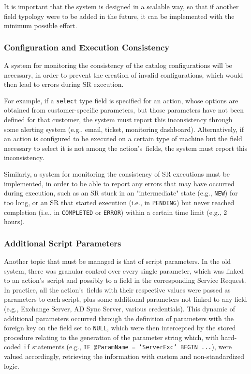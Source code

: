 It is important that the system is designed in a scalable way, so that if another field typology were to be added in the future, it can be implemented with the minimum possible effort.

\subsubsection{Configuration and Execution Consistency}
A system for monitoring the consistency of the catalog configurations \cite{requirements_meeting} will be necessary, in order to prevent the creation of invalid configurations, which would then lead to errors during SR execution.

For example, if a \texttt{select} type field is specified for an action, whose options are obtained from customer-specific parameters, but those parameters have not been defined for that customer, the system must report this inconsistency through some alerting system (e.g., email, ticket, monitoring dashboard).
Alternatively, if an action is configured to be executed on a certain type of machine but the field necessary to select it is not among the action's~fields, the system must report this inconsistency.

Similarly, a system for monitoring the consistency of SR executions must be implemented, in order to be able to report any errors that may have occurred during execution, such as an SR stuck in an "intermediate" state (e.g., \texttt{NEW}) for too long, or an SR that started execution (i.e., in \texttt{PENDING}) but never reached completion (i.e., in \texttt{COMPLETED} or \texttt{ERROR}) within a certain time limit (e.g., 2 hours).

\subsubsection{Additional Script Parameters}
Another topic that must be managed is that of script parameters. In the old system, there was granular control over every single parameter, which was linked to an action's~script and possibly to a field in the corresponding Service Request. In practice, all the action's~fields with their respective values were passed as parameters to each script, plus some additional parameters not linked to any field (e.g., Exchange Server, AD Sync Server, various credentials). This dynamic of additional parameters occurred through the definition of parameters with the foreign key on the field set to \texttt{NULL}, which were then intercepted by the stored procedure relating to the generation of the parameter string which, with hard-coded \texttt{if} statements (e.g., \texttt{IF @ParamName = 'ServerExc' BEGIN ...}), were valued accordingly, retrieving the information with custom and non-standardized logic.

